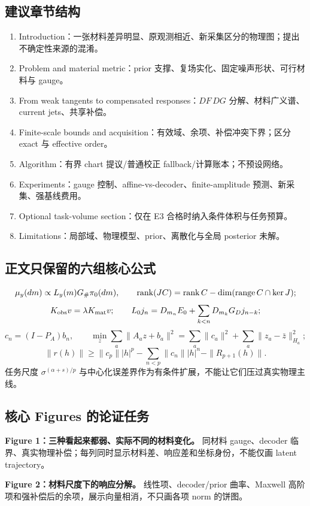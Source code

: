 \subsection{建议章节结构}
\begin{enumerate}
\item Introduction：一张材料差异明显、原观测相近、新采集区分的物理图；提出不确定性来源的混淆。
\item Problem and material metric：prior 支撑、复场实化、固定噪声形状、可行材料与 gauge。
\item From weak tangents to compensated responses：$DF\,DG$ 分解、材料广义谱、current jets、共享补偿。
\item Finite-scale bounds and acquisition：有效域、余项、补偿冲突下界；区分 exact 与 effective order。
\item Algorithm：有界 chart 提议/普通校正 fallback/计算账本；不预设网络。
\item Experiments：gauge 控制、affine-vs-decoder、finite-amplitude 预测、新采集、强基线费用。
\item Optional task-volume section：仅在 E3 合格时纳入条件体积与任务预算。
\item Limitations：局部域、物理模型、prior、离散化与全局 posterior 未解。
\end{enumerate}

\subsection{正文只保留的六组核心公式}
\[
\mu_y(dm)\propto L_y(m)G_\#\pi_0(dm),\qquad
\operatorname{rank}(JC)=\operatorname{rank} C-\dim(\operatorname{range} C\cap\ker J);
\]
\[
K_{\rm obs}v=\lambda K_{\rm mat}v;
\qquad
L_0j_n=D_{m_n}E_0+\sum_{k<n}D_{m_k}G_Dj_{n-k};
\]
\[
c_n=(I-P_A)b_n,\qquad
\min_z\sum_a\|A_az+b_a\|^2
=\sum_a\|c_a\|^2+\sum_a\|z_a-\bar z\|_{H_a}^2;
\]
\[
\|r(h)\|\ge
\|c_p\||h|^p-\sum_{n<p}\|c_n\||h|^n-\|R_{p+1}(h)\|.
\]
任务尺度 $\sigma^{(\alpha+s)/p}$ 与中心化误差界作为有条件扩展，不能让它们压过真实物理主线。

\subsection{核心 Figures 的论证任务}
\textbf{Figure 1：三种看起来都弱、实际不同的材料变化。}
同材料 gauge、decoder 临界、真实物理补偿；每列同时显示材料差、响应差和坐标身份，不能仅画 latent trajectory。

\textbf{Figure 2：材料尺度下的响应分解。}
线性项、decoder/prior 曲率、Maxwell 高阶项和强补偿后的余项，展示向量相消，不只画各项 norm 的饼图。

